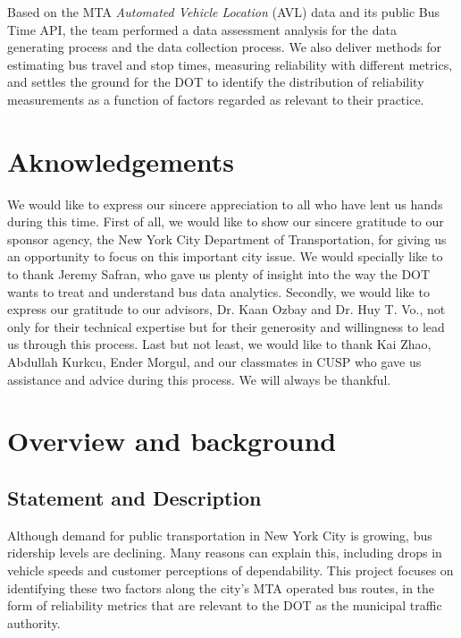 \documentclass[12pt]{report}
\begin{document}
Based on the MTA \textit{Automated Vehicle Location} (AVL) data and its public Bus Time API, the team performed a data assessment analysis for the data generating process and the data collection process. We also deliver methods for estimating bus travel and stop times, measuring reliability with different metrics, and settles the ground for the DOT to identify the distribution of reliability measurements as a function of factors regarded as relevant to their practice.
        
\section*{Aknowledgements}

We would like to express our sincere appreciation to all who have lent us hands during this time.  First of all, we would like to show our sincere gratitude to our sponsor agency, the New York City Department of Transportation, for giving us an opportunity to focus on this important city issue.  We would specially like to to thank Jeremy Safran, who gave us plenty of insight into the way the DOT wants to treat and understand bus data analytics.  Secondly, we would like to express our gratitude to our advisors, Dr. Kaan Ozbay and Dr. Huy T. Vo., not only for their technical expertise but for their generosity and willingness to lead us through this process.  Last but not least, we would like to thank Kai Zhao, Abdullah Kurkcu, Ender Morgul, and our classmates in CUSP who gave us assistance and advice during this process.  We will always be thankful.


\newpage

\section{Overview and background}


\subsection{	Statement and Description}
Although demand for public transportation in New York City is growing, bus ridership levels are declining.  Many reasons can explain this, including drops in vehicle speeds and customer perceptions of dependability.  This project focuses on identifying these two factors along the city's MTA operated bus routes, in the form of reliability metrics that are relevant to the DOT as the municipal traffic authority.
\end{document}
